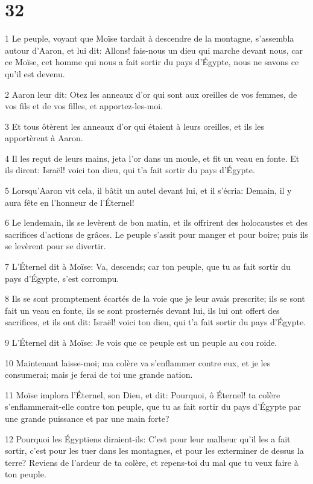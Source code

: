 \chapter{32}

\par 1 Le peuple, voyant que Moïse tardait à descendre de la montagne, s'assembla autour d'Aaron, et lui dit: Allons! fais-nous un dieu qui marche devant nous, car ce Moïse, cet homme qui nous a fait sortir du pays d'Égypte, nous ne savons ce qu'il est devenu.
\par 2 Aaron leur dit: Otez les anneaux d'or qui sont aux oreilles de vos femmes, de vos fils et de vos filles, et apportez-les-moi.
\par 3 Et tous ôtèrent les anneaux d'or qui étaient à leurs oreilles, et ils les apportèrent à Aaron.
\par 4 Il les reçut de leurs mains, jeta l'or dans un moule, et fit un veau en fonte. Et ils dirent: Israël! voici ton dieu, qui t'a fait sortir du pays d'Égypte.
\par 5 Lorsqu'Aaron vit cela, il bâtit un autel devant lui, et il s'écria: Demain, il y aura fête en l'honneur de l'Éternel!
\par 6 Le lendemain, ils se levèrent de bon matin, et ils offrirent des holocaustes et des sacrifices d'actions de grâces. Le peuple s'assit pour manger et pour boire; puis ils se levèrent pour se divertir.
\par 7 L'Éternel dit à Moïse: Va, descends; car ton peuple, que tu as fait sortir du pays d'Égypte, s'est corrompu.
\par 8 Ils se sont promptement écartés de la voie que je leur avais prescrite; ils se sont fait un veau en fonte, ils se sont prosternés devant lui, ils lui ont offert des sacrifices, et ils ont dit: Israël! voici ton dieu, qui t'a fait sortir du pays d'Égypte.
\par 9 L'Éternel dit à Moïse: Je vois que ce peuple est un peuple au cou roide.
\par 10 Maintenant laisse-moi; ma colère va s'enflammer contre eux, et je les consumerai; mais je ferai de toi une grande nation.
\par 11 Moïse implora l'Éternel, son Dieu, et dit: Pourquoi, ô Éternel! ta colère s'enflammerait-elle contre ton peuple, que tu as fait sortir du pays d'Égypte par une grande puissance et par une main forte?
\par 12 Pourquoi les Égyptiens diraient-ils: C'est pour leur malheur qu'il les a fait sortir, c'est pour les tuer dans les montagnes, et pour les exterminer de dessus la terre? Reviens de l'ardeur de ta colère, et repens-toi du mal que tu veux faire à ton peuple.
